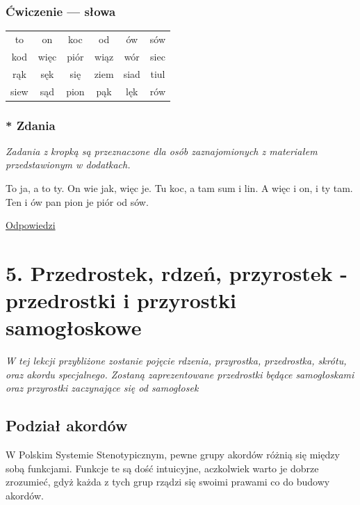 \documentclass[12p, oneside]{book}
\begin{document}
\subsubsection{Ćwiczenie --- słowa}

\begin{tabular}{c c c c c c}
	to & on & koc & od & ów & sów \\
	kod & więc & piór & wiąz & wór & siec \\
	rąk & sęk & się & ziem & siad & tiul \\
	siew & sąd & pion & pąk & lęk & rów \\
\end{tabular}
\normalsize

\subsubsection{* Zdania}
\emph{Zadania z kropką są przeznaczone dla osób zaznajomionych z materiałem przedstawionym w dodatkach.}

\Large
To ja, a to ty. On wie jak, więc je. Tu koc, a tam sum i lin. A więc i on, i ty tam. Ten i ów pan pion je piór od sów.
\normalsize

\hyperref[odp:4]{Odpowiedzi}

\newpage

\section{5. Przedrostek, rdzeń, przyrostek - przedrostki i przyrostki samogłoskowe}

\emph{W tej lekcji przybliżone zostanie pojęcie rdzenia, przyrostka, przedrostka, skrótu, oraz akordu specjalnego. Zostaną zaprezentowane przedrostki będące samogłoskami oraz przyrostki zaczynające się od samogłosek}

\subsection*{Podział akordów}

W Polskim Systemie Stenotypicznym, pewne grupy akordów różnią się między sobą funkcjami. Funkcje te są dość intuicyjne, aczkolwiek warto je dobrze zrozumieć, gdyż każda z tych grup rządzi się swoimi prawami co do budowy akordów.
\end{document}
